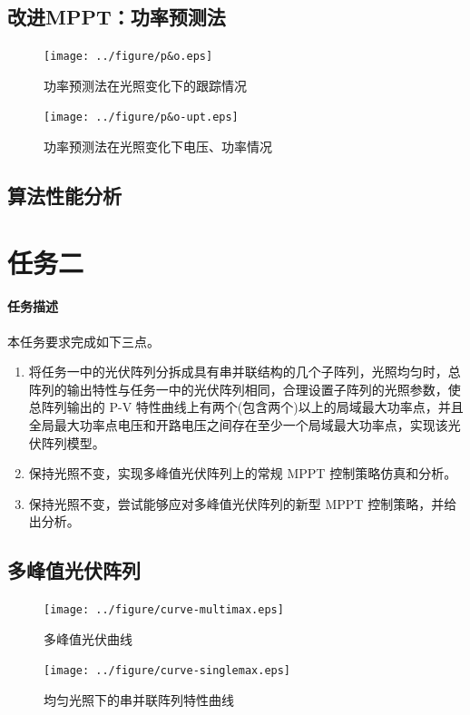 \documentclass[a4paper,12pt]{article}
\begin{document}
    \subsection{改进MPPT：功率预测法} %
    \label{sub:改进mppt_功率预测法}
    \begin{figure}[htbp]
        \centering
        \texttt{[image: ../figure/p\&o.eps]}
        \caption{功率预测法在光照变化下的跟踪情况}
        \label{fig:po}
    \end{figure}
    \begin{figure}[htbp]
        \centering
        \texttt{[image: ../figure/p\&o-upt.eps]}
        \caption{功率预测法在光照变化下电压、功率情况}
        \label{fig:po-upt}
    \end{figure}
    \subsection{算法性能分析} %
    \label{sub:算法性能分析}
    
    \section{任务二} %
    \label{sec:任务二}
    \paragraph{任务描述} %
    本任务要求完成如下三点。
    \begin{enumerate}[noitemsep,topsep=0pt]
    \item 将任务一中的光伏阵列分拆成具有串并联结构的几个子阵列，光照均匀时，总阵列的输出特性与任务一中的光伏阵列相同，合理设置子阵列的光照参数，使总阵列输出的 P-V 特性曲线上有两个(包含两个)以上的局域最大功率点，并且全局最大功率点电压和开路电压之间存在至少一个局域最大功率点，实现该光伏阵列模型。
    \item 保持光照不变，实现多峰值光伏阵列上的常规 MPPT 控制策略仿真和分析。
    \item 保持光照不变，尝试能够应对多峰值光伏阵列的新型 MPPT 控制策略，并给出分析。
    \end{enumerate}    
    \subsection{多峰值光伏阵列} %
    \label{sub:多峰值光伏阵列}
    \begin{figure}[htbp]
        \centering
        \texttt{[image: ../figure/curve-multimax.eps]}
        \caption{多峰值光伏曲线}
        \label{fig:curve-multimax}
    \end{figure}
    \begin{figure}[htbp]
        \centering
        \texttt{[image: ../figure/curve-singlemax.eps]}
        \caption{均匀光照下的串并联阵列特性曲线}
        \label{fig:curve-singlemax}
    \end{figure}
\end{document}
